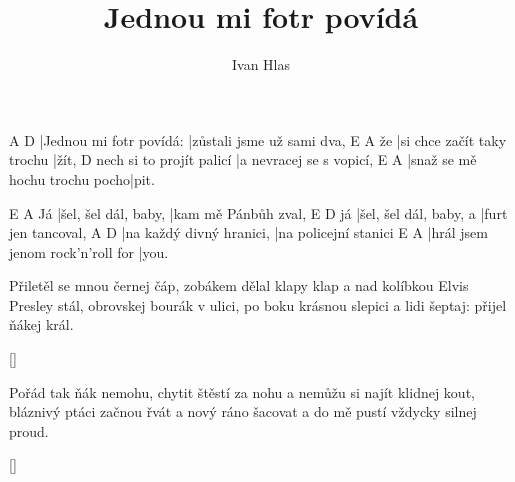 \documentclass{song}
\title{Jednou mi fotr povídá}
\author{Ivan Hlas}
\begin{document}
\strophe
A\7						D\7
|Jednou mi fotr povídá: |zůstali jsme už sami dva,
   E\7						  A\7
že |si chce začít taky trochu |žít,
						 D\7
nech si to projít palicí |a nevracej se s vopicí,
E\7							  A\7
|snaž se mě hochu trochu pocho|pit.
\endstrophe

   E\7                  A\7
Já |šel, šel dál, baby, |kam mě Pánbůh zval,
   E\7					  D\7
já |šel, šel dál, baby, a |furt jen tancoval,
A\7                      D\7
|na každý divný hranici, |na policejní stanici
E\7								 A\7
|hrál jsem jenom rock'n'roll for |you.
\endstrophe

\strophe*
Přiletěl se mnou černej čáp, zobákem dělal klapy klap
a nad kolíbkou Elvis Presley stál,
obrovskej bourák v ulici, po boku krásnou slepici
a lidi šeptaj: přijel ňákej král.
\endstrophe

\ref{}

\strophe*
Pořád tak ňák nemohu, chytit štěstí za nohu
a nemůžu si najít klidnej kout,
bláznivý ptáci začnou řvát a nový ráno šacovat
a do mě pustí vždycky silnej proud.
\endstrophe

\ref{}
\end{document}
